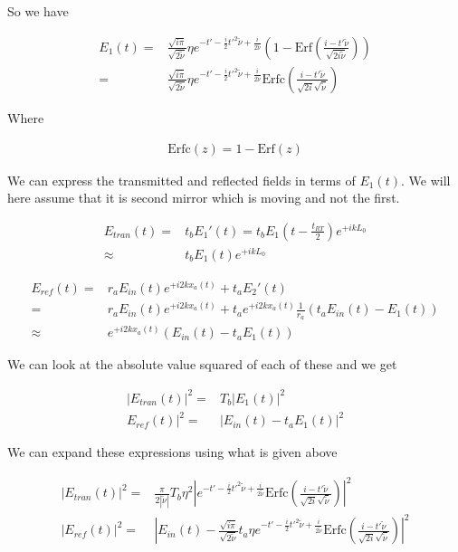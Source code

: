 \documentclass[12pt]{article}
\begin{document}
So we have

\begin{align}
E_1(t) =& \frac{\sqrt{i \pi}}{\sqrt{2\tilde{\nu}}}\eta e^{-t' -\frac{i}{2}t'^2\tilde{\nu} + \frac{i}{2\tilde{\nu}}}\left(1 - \text{Erf}\left(\frac{i-t'\tilde{\nu}}{\sqrt{2i\tilde{\nu}}}\right)\right)\\
=& \frac{\sqrt{i \pi}}{\sqrt{2\tilde{\nu}}}\eta e^{-t'-\frac{i}{2}t'^2\tilde{\nu} + \frac{i}{2\tilde{\nu}}} \text{Erfc}\left(\frac{i-t'\tilde{\nu}}{\sqrt{2i}\sqrt{\tilde{\nu}}}\right)
\end{align}

Where

\begin{align}
\text{Erfc}(z) = 1-\text{Erf}(z)
\end{align}

We can express the transmitted and reflected fields in terms of $E_1(t)$.
We will here assume that it is second mirror which is moving and not the first. 

\begin{align}
E_{tran}(t) =& t_b E_1'(t) = t_b E_1\left(t-\frac{t_{RT}}{2}\right)e^{+ikL_0}\\
\approx & t_bE_1(t) e^{+ikL_0}
\end{align}

\begin{align}
E_{ref}(t) =& r_aE_{in}(t)e^{+i2kx_a(t)} + t_aE_2'(t)\\
=& r_aE_{in}(t)e^{+i2kx_a(t)} + t_a e^{+i2kx_a(t)}\frac{1}{r_a}\left(t_aE_{in}(t) - E_1(t)\right)\\
\approx & e^{+i2kx_a(t)}\left(E_{in}(t) - t_a E_1(t)\right)
\end{align}

We can look at the absolute value squared of each of these and we get

\begin{align}
|E_{tran}(t)|^2 =& T_b |E_1(t)|^2\\
E_{ref}(t)|^2 =& |E_{in}(t) - t_aE_1(t)|^2
\end{align}

We can expand these expressions using what is given above

\begin{align}
|E_{tran}(t)|^2 =& \frac{\pi}{2|\tilde{\nu}|} T_b\eta^2 \left\lvert e^{-t' - \frac{i}{2}t'^2 \tilde{\nu} + \frac{i}{2\tilde{\nu}}} \text{Erfc}\left(\frac{i-t'\tilde{\nu}}{\sqrt{2i}\sqrt{\tilde{\nu}}}\right) \right\rvert^2\\
|E_{ref}(t)|^2 =& \left\lvert E_{in}(t) -  \frac{\sqrt{i \pi}}{\sqrt{2\tilde{\nu}}}t_a\eta e^{-t'-\frac{i}{2}t'^2\tilde{\nu} + \frac{i}{2\tilde{\nu}}} \text{Erfc}\left(\frac{i-t'\tilde{\nu}}{\sqrt{2i}\sqrt{\tilde{\nu}}}\right)\right\rvert^2
\end{align}
\end{document}
